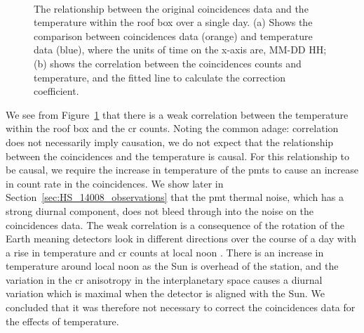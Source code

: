 \begin{figure}[ht!]
	\centering
	 \\
	
	\caption{The relationship between the original coincidences data and the temperature within the roof box over a single day. (a) Shows the comparison between coincidences data (orange) and temperature data (blue), where the units of time on the x-axis are, MM-DD HH; (b) shows the correlation between the coincidences counts and temperature, and the fitted line to calculate the correction coefficient.}
	\label{fig:14008_coincidences_v_T_corr}
\end{figure}

We see from Figure~\ref{fig:14008_coincidences_v_T_corr} that there is a weak correlation between the temperature within the roof box and the \gls{cr} counts. Noting the common adage: correlation does not necessarily imply causation, we do not expect that the relationship between the coincidences and the temperature is causal. For this relationship to be causal, we require the increase in temperature of the \glspl{pmt} to cause an increase in count rate in the coincidences. We show later in Section~\ref{sec:HS_14008_observations} that the \gls{pmt} thermal noise, which has a strong diurnal component, does not bleed through into the noise on the coincidences data. The weak correlation is a consequence of the rotation of the Earth meaning detectors look in
different directions over the course of a day with a rise in temperature and \gls{cr} counts at local noon \citep{parker_theory_1964, mishra_study_2007, mishra_cosmic_2008}. There is an increase in temperature around local noon as the Sun is overhead of the station, and the variation in the \gls{cr} anisotropy in the interplanetary space causes a diurnal variation which is maximal when the detector is aligned with the Sun. We concluded that it was therefore not necessary to correct the coincidences data for the effects of temperature.


